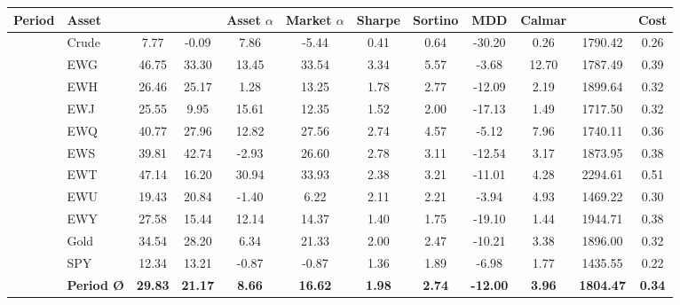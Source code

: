 \begin{table}[p]
\centering
\footnotesize
\setlength{\tabcolsep}{3.5pt}
\begin{tabular}{llS[table-format=-3.2]S[table-format=-3.2]S[table-format=-3.2]S[table-format=-3.2]S[table-format=-2.2]S[table-format=-2.2]S[table-format=-3.2]S[table-format=-3.2]S[table-format=5.2]S[table-format=2.2]}
\toprule
\textbf{Period} & \textbf{Asset} & {} & {} & {Asset $\alpha$ } & {Market $\alpha$ } & {Sharpe} & {Sortino} & {MDD } & {Calmar} & {} & {Cost } \\
\midrule
{} & Crude & 7.77 & -0.09 & 7.86 & -5.44 & 0.41 & 0.64 & -30.20 & 0.26 & 1790.42 & 0.26 \\
 & EWG & 46.75 & 33.30 & 13.45 & 33.54 & 3.34 & 5.57 & -3.68 & 12.70 & 1787.49 & 0.39 \\
 & EWH & 26.46 & 25.17 & 1.28 & 13.25 & 1.78 & 2.77 & -12.09 & 2.19 & 1899.64 & 0.32 \\
 & EWJ & 25.55 & 9.95 & 15.61 & 12.35 & 1.52 & 2.00 & -17.13 & 1.49 & 1717.50 & 0.32 \\
 & EWQ & 40.77 & 27.96 & 12.82 & 27.56 & 2.74 & 4.57 & -5.12 & 7.96 & 1740.11 & 0.36 \\
 & EWS & 39.81 & 42.74 & -2.93 & 26.60 & 2.78 & 3.11 & -12.54 & 3.17 & 1873.95 & 0.38 \\
 & EWT & 47.14 & 16.20 & 30.94 & 33.93 & 2.38 & 3.21 & -11.01 & 4.28 & 2294.61 & 0.51 \\
 & EWU & 19.43 & 20.84 & -1.40 & 6.22 & 2.11 & 2.21 & -3.94 & 4.93 & 1469.22 & 0.30 \\
 & EWY & 27.58 & 15.44 & 12.14 & 14.37 & 1.40 & 1.75 & -19.10 & 1.44 & 1944.71 & 0.38 \\
 & Gold & 34.54 & 28.20 & 6.34 & 21.33 & 2.00 & 2.47 & -10.21 & 3.38 & 1896.00 & 0.32 \\
 & SPY & 12.34 & 13.21 & -0.87 & -0.87 & 1.36 & 1.89 & -6.98 & 1.77 & 1435.55 & 0.22 \\
\midrule
 & \bfseries Period \O{} & \bfseries 29.83 & \bfseries 21.17 & \bfseries 8.66 & \bfseries 16.62 & \bfseries 1.98 & \bfseries 2.74 & \bfseries -12.00 & \bfseries 3.96 & \bfseries 1804.47 & \bfseries 0.34 \\

\end{tabular}
\end{table}
